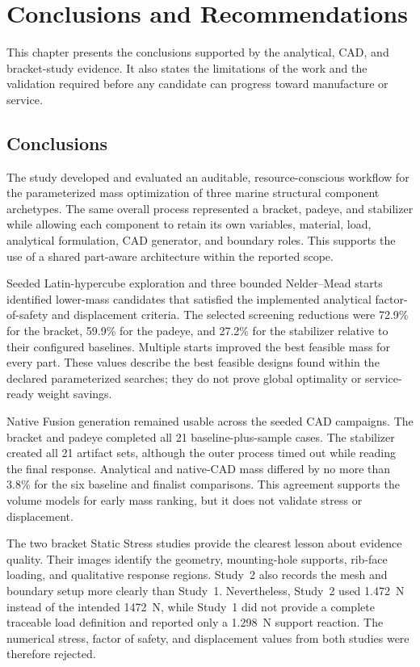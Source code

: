 \chapter{Conclusions and Recommendations}
\label{chap:conclusion}

This chapter presents the conclusions supported by the analytical, CAD, and
bracket-study evidence. It also states the limitations of the work and the
validation required before any candidate can progress toward manufacture or
service.

\section{Conclusions}
\label{sec:overall-conclusion}

The study developed and evaluated an auditable, resource-conscious workflow
for the parameterized mass optimization of three marine structural component
archetypes. The same overall process represented a bracket, padeye, and
stabilizer while allowing each component to retain its own variables,
material, load, analytical formulation, CAD generator, and boundary roles.
This supports the use of a shared part-aware architecture within the reported
scope.

Seeded Latin-hypercube exploration and three bounded Nelder--Mead starts
identified lower-mass candidates that satisfied the implemented analytical
factor-of-safety and displacement criteria. The selected screening reductions
were 72.9\% for the bracket, 59.9\% for the padeye, and 27.2\% for the
stabilizer relative to their configured baselines. Multiple starts improved
the best feasible mass for every part. These values describe the best
feasible designs found within the declared parameterized searches; they do not
prove global optimality or service-ready weight savings.

Native Fusion generation remained usable across the seeded CAD campaigns. The
bracket and padeye completed all 21 baseline-plus-sample cases. The stabilizer
created all 21 artifact sets, although the outer process timed out while
reading the final response. Analytical and native-CAD mass differed by no more
than 3.8\% for the six baseline and finalist comparisons. This agreement
supports the volume models for early mass ranking, but it does not validate
stress or displacement.

The two bracket Static Stress studies provide the clearest lesson about
evidence quality. Their images identify the geometry, mounting-hole supports,
rib-face loading, and qualitative response regions. Study~2 also records the
mesh and boundary setup more clearly than Study~1. Nevertheless, Study~2 used
1.472~N instead of the intended 1472~N, while Study~1 did not provide a
complete traceable load definition and reported only a 1.298~N support
reaction. The numerical stress, factor of safety, and displacement values from
both studies were therefore rejected.

